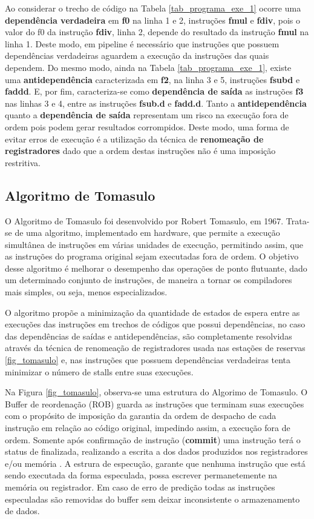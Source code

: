 \documentclass[12pt]{article}
\begin{document}
Ao considerar o trecho de código na Tabela \ref{tab_programa_exe_1} ocorre uma \textbf{dependência verdadeira} em \textbf{f0} na linha 1 e 2, instruções \textbf{fmul} e \textbf{fdiv}, pois o valor do f0 da instrução \textbf{fdiv}, linha 2, depende do resultado da instrução \textbf{fmul} na linha 1. Deste modo, em pipeline é necessário que instruções que possuem dependências verdadeiras aguardem a execução da instruções das quais dependem. Do mesmo modo, ainda na Tabela \ref{tab_programa_exe_1}, existe uma \textbf{antidependência} caracterizada em \textbf{f2}, na linha 3 e 5, instruções \textbf{fsubd} e \textbf{faddd}. E, por fim, caracteriza-se como \textbf{dependência de saída} as instruções \textbf{f3} nas linhas 3 e 4, entre as instruções \textbf{fsub.d} e \textbf{fadd.d}. Tanto a \textbf{antidependência} quanto a \textbf{dependência de saída}  representam um risco na execução fora de ordem pois podem gerar resultados corrompidos. Deste modo, uma forma de evitar erros de execução é a utilização da técnica de \textbf{renomeação de registradores} dado que a ordem destas instruções não é uma imposição restritiva.


\subsection{Algoritmo de Tomasulo}

O Algoritmo de Tomasulo foi desenvolvido por Robert Tomasulo, em 1967. Trata-se de uma algoritmo, implementado em hardware, que permite a execução simultânea de instruções em várias unidades de execução, permitindo assim, que as instruções do programa original sejam executadas fora de ordem. O objetivo desse algoritmo é melhorar o desempenho das operações de ponto flutuante, dado um determinado conjunto de instruções, de maneira a tornar os compiladores mais simples, ou seja, menos especializados.

O algoritmo propõe a minimização da quantidade de estados de espera entre as execuções das instruções em trechos de códigos que possui dependências, no caso das dependências de saídas e antidependências, são completamente resolvidas através da técnica de renomeação de registradores usada nas estações de reservas \ref{fig_tomasulo} e, nas instruções que possuem dependências verdadeiras tenta minimizar o número de stalls entre suas execuções.

Na Figura \ref{fig_tomasulo}, observa-se uma estrutura do Algorimo de Tomasulo. O Buffer de reordenação (ROB) guarda as instruções que terminam suas execuções com o propósito de imposição da garantia da ordem de despacho de cada instrução em relação ao código original, impedindo assim, a execução fora de ordem. Somente após confirmação de instrução (\textbf{commit}) uma instrução terá o status de finalizada, realizando a escrita a dos dados produzidos nos registradores e/ou memória \cite{hennessy:2019}. A estrura de especução, garante que nenhuma instrução que está sendo executada da forma especulada, possa escrever permanetemente na memória ou registrador. Em caso de erro de predição todas as instruções especuladas são removidas do buffer sem deixar inconsistente o armazenamento de dados.
\end{document}
